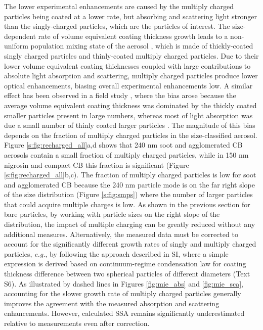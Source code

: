 The lower experimental enhancements are caused by the multiply charged particles being coated at a lower rate, but absorbing and scattering light stronger than the singly-charged particles, which are the particles of interest. The size-dependent rate of volume equivalent coating thickness growth leads to a non-uniform population mixing state of the aerosol \citep{RN75}, which is made of thickly-coated singly charged particles and thinly-coated multiply charged particles. Due to their lower volume equivalent coating thicknesses coupled with large contributions to absolute light absorption and scattering, multiply charged particles produce lower optical enhancements, biasing overall experimental enhancements low. A similar effect has been observed in a field study \citep{RN76}, where the bias arose because the average volume equivalent coating thickness was dominated by the thickly coated smaller particles present in large numbers, whereas most of light absorption was due a small number of thinly coated larger particles \citep{RN52,RN75}. The magnitude of this bias depends on the fraction of multiply charged particles in the size-classified aerosol. Figure \ref{s:fig:recharged_all}a,d shows that 240 nm soot and agglomerated CB aerosols contain a small fraction of multiply charged particles, while in 150 nm nigrosin and compact CB this fraction is significant (Figure \ref{s:fig:recharged_all}b,c). The fraction of multiply charged particles is low for soot and agglomerated CB because the 240 nm particle mode is on the far right slope of the size distribution (Figure \ref{s:fig:smps}) where the number of larger particles that could acquire multiple charges is low. As shown in the previous section for bare particles, by working with particle sizes on the right slope of the distribution, the impact of multiple charging can be greatly reduced without any additional measures. Alternatively, the measured data must be corrected to account for the significantly different growth rates of singly and multiply charged particles, \textit{e.g.}, by following the approach described in SI, where a simple expression is derived based on continuum-regime condensation law for coating thickness difference between two spherical particles of different diameters (Text S6). As illustrated by dashed lines in Figures \ref{fig:mie_abs} and \ref{fig:mie_sca}, accounting for the slower growth rate of multiply charged particles generally improves the agreement with the measured absorption and scattering enhancements. However, calculated SSA remains significantly underestimated relative to measurements even after correction.

